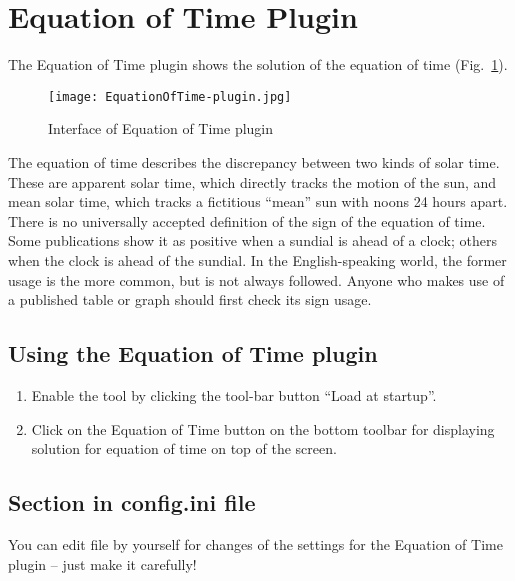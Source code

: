 \section{Equation of Time Plugin}
\label{sec:plugins:EquationOfTime}
The Equation of Time plugin shows the solution of the equation of time (Fig.~\ref{fig:EqOfTime}).

\begin{figure}[h]
\texttt{[image: EquationOfTime-plugin.jpg]}
\label{fig:EqOfTime}
\caption{Interface of Equation of Time plugin}
\end{figure}

The equation of time describes the discrepancy between two kinds of solar time. These are apparent solar time, which directly tracks the motion of the sun, and mean solar time, which tracks a fictitious ``mean'' sun with noons 24 hours apart. There is no universally accepted definition of the sign of the equation of time. Some publications show it as positive when a sundial is ahead of a clock; others when the clock is ahead of the sundial. In the English-speaking world, the former usage is the more common, but is not always followed. Anyone who makes use of a published table or graph should first check its sign usage.

\subsection{Using the Equation of Time plugin}
\label{sec:plugins:EquationOfTime:using}

\begin{enumerate}
\item Enable the tool by clicking the tool-bar button ``Load at startup''.
\item Click on the Equation of Time button on the bottom toolbar for displaying solution for equation of time on top of the screen.
\end{enumerate}

\subsection{Section  in config.ini file}
\label{sec:plugins:EquationOfTime:config}

You can edit  file by yourself for changes of the
settings for the Equation of Time plugin -- just make it carefully!

